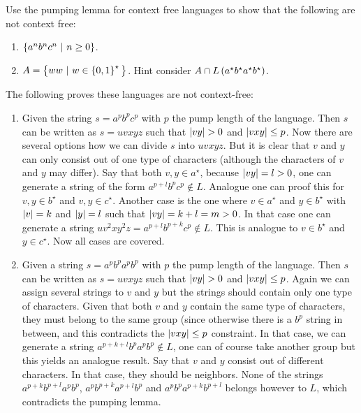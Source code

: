 \documentclass{article}
\begin{document}
\begin{exercise}
Use the pumping lemma for context free languages to show that the following are not context free:
\begin{enumerate}
 \item $\left\{ a^nb^nc^n\ |\ n\geq0 \right\}$.
 \item $A=\left\{ ww\ |\ w\in\left\{ 0,1 \right\}^\star{} \right\}$. Hint consider $A\cap L\left( a^{\star}b^{\star}a^{\star}b^{\star} \right)$.
\end{enumerate}
\begin{answer}
The following proves these languages are not context-free:
\begin{enumerate}
 \item Given the string $s=a^pb^pc^p$ with $p$ the pump length of the language. Then $s$ can be written as $s=uvxyz$ such that $\abs{vy}>0$ and $\left|vxy\right|\leq p$. Now there are several options how we can divide $s$ into $uvxyz$. But it is clear that $v$ and $y$ can only consist out of one type of characters (although the characters of $v$ and $y$ may differ). Say that both $v,y\in a^{\star}$, because $\left|vy\right|=l>0$, one can generate a string of the form $a^{p+l}b^pc^p\notin L$. Analogue one can proof this for $v,y\in b^{\star}$ and $v,y\in c^{\star}$. Another case is the one where $v\in a^{\star}$ and $y\in b^{\star}$ with $\left|v\right|=k$ and $\left|y\right|=l$ such that $\left|vy\right|=k+l=m>0$. In that case one can generate a string $uv^2xy^2z=a^{p+l}b^{p+k}c^p\notin L$. This is analogue to $v\in b^{\star}$ and $y\in c^{\star}$. Now all cases are covered.
 \item Given a string $s=a^pb^pa^pb^p$ with $p$ the pump length of the language. Then $s$ can be written as $s=uvxyz$ such that $\abs{vy}>0$ and $\left|vxy\right|\leq p$. Again we can assign several strings to $v$ and $y$ but the strings should contain only one type of characters. Given that both $v$ and $y$ contain the same type of characters, they must belong to the same group (since otherwise there is a $b^p$ string in between, and this contradicts the $\left|vxy\right|\leq p$ constraint. In that case, we can generate a string $a^{p+k+l}b^pa^pb^p\notin L$, one can of course take another group but this yields an analogue result. Say that $v$ and $y$ consist out of different characters. In that case, they should be neighbors. None of the strings $a^{p+k}b^{p+l}a^pb^p$, $a^pb^{p+k}a^{p+l}b^p$ and $a^pb^pa^{p+k}b^{p+l}$ belongs however to $L$, which contradicts the pumping lemma.
\end{enumerate}
\end{answer}
\end{exercise}
\end{document}
